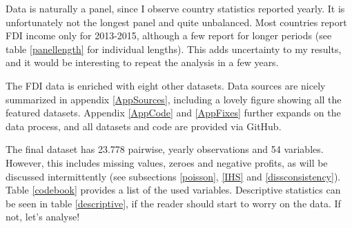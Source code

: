 \documentclass[twoside,a4paper,11pt]{article}
\begin{document}
Data is naturally a panel, since I observe country statistics reported yearly. It is unfortunately not the longest panel and quite unbalanced. Most countries report FDI income only for 2013-2015, although a few report for longer periods (see table \ref{panellength} for individual lengths). This adds uncertainty to my results, and it would be interesting to repeat the analysis in a few years.

The FDI data is enriched with eight other datasets. Data sources are nicely summarized in appendix \ref{AppSources}, including a lovely figure showing all the featured datasets. Appendix \ref{AppCode} and \ref{AppFixes} further expands on the data process, and all datasets and code are provided via GitHub.  

The final dataset has 23.778 pairwise, yearly observations and 54 variables. However, this includes missing values, zeroes and negative profits, as will be discussed intermittently (see subsections \ref{poisson}, \ref{IHS} and \ref{dissconsistency}). Table \ref{codebook} provides a list of the used variables. Descriptive statistics can be seen in table \ref{descriptive}, if the reader should start to worry on the data. If not, let's analyse! 
\begin{table}
	\label{codebook}
\end{table}
\end{document}
